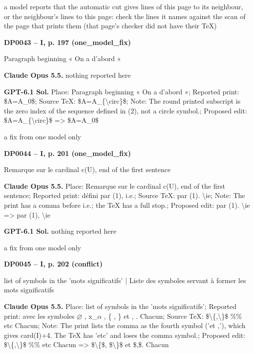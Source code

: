 a model reports that the automatic cut gives lines of this page to its neighbour, or the neighbour's lines to this page: check the lines it names against the scan of the page that prints them (that page's checker did not have their TeX)\par
\par\noindent\hypertarget{DP0043}{}\textbf{DP0043 -- I, p. 197 (one\_model\_fix)}\par
Paragraph beginning « On a d'abord »\par
\textbf{Claude Opus 5.5.} nothing reported here\par
\textbf{GPT-6.1 Sol.} Place: Paragraph beginning « On a d'abord »; Reported print: \$A=\allowbreak A\_0\$; Source TeX: \$A=\allowbreak A\_\{\textbackslash{}circ\}\$; Note: The round printed subscript is the zero index of the sequence defined in (2), not a circle symbol.; Proposed edit: \$A=\allowbreak A\_\{\textbackslash{}circ\}\$ =\allowbreak > \$A=\allowbreak A\_0\$\par
a fix from one model only\par
\par\noindent\hypertarget{DP0044}{}\textbf{DP0044 -- I, p. 201 (one\_model\_fix)}\par
Remarque sur le cardinal c(U), end of the first sentence\par
\textbf{Claude Opus 5.5.} Place: Remarque sur le cardinal c(U), end of the first sentence; Reported print: défini par (1), i.e.; Source TeX: par (1). \textbackslash{}ie; Note: The print has a comma before i.e.; the TeX has a full stop.; Proposed edit: par (1). \textbackslash{}ie =\allowbreak > par (1), \textbackslash{}ie\par
\textbf{GPT-6.1 Sol.} nothing reported here\par
a fix from one model only\par
\par\noindent\hypertarget{DP0045}{}\textbf{DP0045 -- I, p. 202 (conflict)}\par
list of symbols in the 'mots significatifs' | Liste des symboles servant à former les mots significatifs\par
\textbf{Claude Opus 5.5.} Place: list of symbols in the 'mots significatifs'; Reported print: avec les symboles \ensuremath{\varnothing} , x\_\ensuremath{\alpha} , \{ , \} et , . Chacun; Source TeX: \$\textbackslash{}\{,\textbackslash{}\}\$ \%\% etc Chacun; Note: The print lists the comma as the fourth symbol ('et ,'), which gives card(I)+4. The TeX has 'etc' and loses the comma symbol.; Proposed edit: \$\textbackslash{}\{,\textbackslash{}\}\$ \%\% etc Chacun =\allowbreak > \$\textbackslash{}\{\$, \$\textbackslash{}\}\$ et \$,\$. Chacun\par
